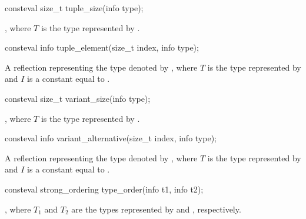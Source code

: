 %
\begin{itemdecl}
consteval size_t tuple_size(info type);
\end{itemdecl}

\begin{itemdescr}
\pnum
\returns
{},
where $T$ is the type represented by .
\end{itemdescr}

%
\begin{itemdecl}
consteval info tuple_element(size_t index, info type);
\end{itemdecl}

\begin{itemdescr}
\pnum
\returns
A reflection representing
the type denoted by ,
where $T$ is the type represented by 
and $I$ is a constant equal to .
\end{itemdescr}

%
\begin{itemdecl}
consteval size_t variant_size(info type);
\end{itemdecl}

\begin{itemdescr}
\pnum
\returns
{},
where $T$ is the type represented by .
\end{itemdescr}

%
\begin{itemdecl}
consteval info variant_alternative(size_t index, info type);
\end{itemdecl}

\begin{itemdescr}
\pnum
\returns
A reflection representing the type denoted by
,
where $T$ is the type represented by 
and $I$ is a constant equal to .
\end{itemdescr}

%
\begin{itemdecl}
consteval strong_ordering type_order(info t1, info t2);
\end{itemdecl}

\begin{itemdescr}
\pnum
\returns
{},
where $T_1$ and $T_2$ are the types
represented by  and , respectively.
\end{itemdescr}

